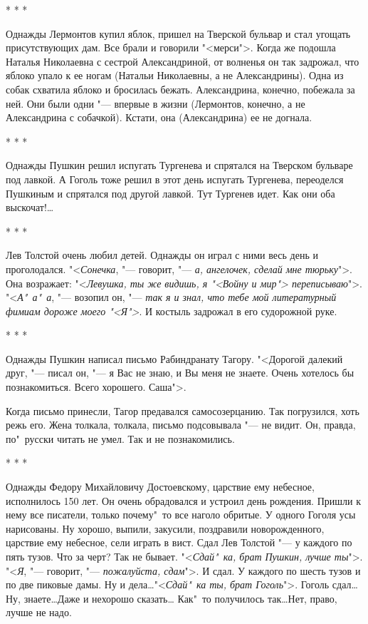 \begin{center}
    * * *
\end{center}

    Однажды Лермонтов купил яблок, пришел на Тверской бульвар и
стал угощать присутствующих дам. Все брали и говорили  "<мерси">.
Когда же подошла Наталья Николаевна с сестрой Александриной, от
волненья  он так задрожал, что яблоко упало к ее ногам (Натальи
Николаевны, а не Александрины). Одна из собак схватила яблоко и
бросилась бежать. Александрина, конечно, побежала за  ней.  Они
были одни "--- впервые в жизни (Лермонтов, конечно, а не Александрина
с собачкой). Кстати, она (Александрина) ее не догнала.

\begin{center}
    * * *
\end{center}

    Однажды  Пушкин  решил  испугать  Тургенева  и спрятался на
Тверском бульваре под лавкой. А Гоголь тоже решил в  этот  день
испугать  Тургенева, переоделся Пушкиным и спрятался под другой
лавкой. Тут Тургенев идет. Как они оба выскочат!\dots

\begin{center}
    * * *
\end{center}

    Лев Толстой очень любил детей. Однажды он играл с ними весь
день и проголодался. "<\textit{Сонечка}, "--- говорит, "--- \textit{а, ангелочек,  сделай
мне тюрьку}">. Она возражает: "<\textit{Левушка, ты же видишь, я "<Войну
и  мир"> переписываю}">. "<\textit{А"~а"~а}, "--- возопил он, "--- \textit{так я и знал,
что тебе мой литературный фимиам дороже моего  "<Я">}.  И  костыль
задрожал в его судорожной руке.

\begin{center}
    * * *
\end{center}

    Однажды Пушкин написал письмо Рабиндранату Тагору. "<Дорогой
далекий друг, "--- писал он, "--- я Вас не знаю, и Вы меня не знаете.
Очень хотелось бы познакомиться. Всего хорошего. Саша">.

    Когда письмо принесли, Тагор предавался самосозерцанию. Так
погрузился, хоть режь его. Жена толкала, толкала, письмо подсовывала  
"--- не видит. Он, правда, по"~русски читать не умел. Так и
не познакомились.

\begin{center}
    * * *
\end{center}

    Однажды Федору Михайловичу Достоевскому, царствие  ему  небесное,  
исполнилось  150  лет.  Он очень обрадовался и устроил
день рождения. Пришли к нему все писатели, только почему"~то все
наголо обритые. У одного Гоголя усы нарисованы. Ну хорошо,  выпили,
закусили, поздравили новорожденного, царствие ему небесное,
сели играть в вист. Сдал Лев Толстой "--- у каждого  по  пять
тузов. Что за черт? Так не бывает. "<\textit{Сдай"~ка, брат Пушкин, лучше
ты}">.  "<\textit{Я},  "--- говорит, "--- \textit{пожалуйста, сдам}">. И сдал. У каждого по
шесть тузов и по две пиковые дамы. Ну и  дела\dots  "<\textit{Сдай"~ка  ты,
брат Гоголь}">. Гоголь сдал\dots Ну, знаете\dots Даже и нехорошо сказать\dots 
Как"~то получилось так\dots Нет, право, лучше не надо.

